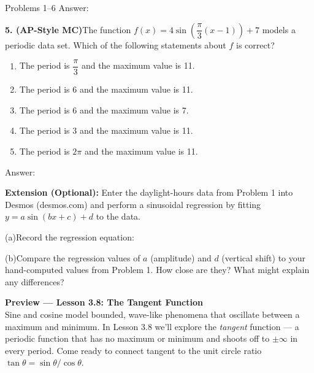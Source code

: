 \documentclass[10pt]{article}
\begin{document}
\begin{notesbox}{Problems 1--6}
Answer: \underline{\hspace{1.5cm}}

\vspace{0.12in}
\textbf{5. (AP-Style MC)}\quad The function $f(x) = 4\sin\!\left(\dfrac{\pi}{3}(x - 1)\right) + 7$
models a periodic data set. Which of the following statements about $f$ is correct?

\begin{enumerate}[label=(\Alph*), leftmargin=2em, itemsep=3pt]
  \item The period is $\dfrac{\pi}{3}$ and the maximum value is 11.
  \item The period is 6 and the maximum value is 11.
  \item The period is 6 and the maximum value is 7.
  \item The period is 3 and the maximum value is 11.
  \item The period is $2\pi$ and the maximum value is 11.
\end{enumerate}

Answer: \underline{\hspace{1.5cm}}

\end{notesbox}

\vspace{0.08in}

\begin{extensionbox}
\textbf{Extension (Optional):} Enter the daylight-hours data from Problem 1 into
Desmos (desmos.com) and perform a sinusoidal regression by fitting
$y = a\sin(bx + c) + d$ to the data.

\vspace{4pt}
(a)\quad Record the regression equation: \writeline

\vspace{4pt}
(b)\quad Compare the regression values of $a$ (amplitude) and $d$ (vertical shift) to
your hand-computed values from Problem 1. How close are they? What might explain
any differences? 
\end{extensionbox}

\vspace{0.08in}

\begin{tcolorbox}[colback=navylight, colframe=navy, arc=2mm,
    left=3mm, right=3mm, top=2mm, bottom=2mm]
\small\textbf{Preview --- Lesson 3.8: The Tangent Function}\\
Sine and cosine model bounded, wave-like phenomena that oscillate between a
maximum and minimum. In Lesson 3.8 we'll explore the \emph{tangent} function ---
a periodic function that has no maximum or minimum and shoots off to $\pm\infty$
in every period. Come ready to connect tangent to the unit circle ratio
$\tan\theta = \sin\theta / \cos\theta$.
\end{tcolorbox}
\end{document}
